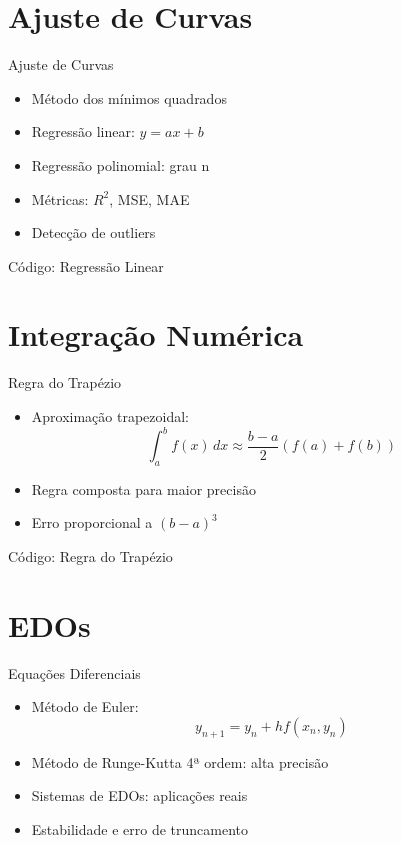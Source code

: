 \documentclass[11pt]{beamer}
\numberwithin{equation}{section}
\begin{document}
\section{Ajuste de Curvas}
\begin{frame}{Ajuste de Curvas}
\begin{itemize}
\item Método dos mínimos quadrados
\item Regressão linear: $y = ax + b$
\item Regressão polinomial: grau n
\item Métricas: $R^2$, MSE, MAE
\item Detecção de outliers
\end{itemize}
\end{frame}

\begin{frame}{Código: Regressão Linear}
\footnotesize
\end{frame}

\section{Integração Numérica}
\begin{frame}{Regra do Trapézio}
\begin{itemize}
\item Aproximação trapezoidal:
\begin{equation}
\int_a^b f(x) \, dx \approx \frac{b-a}{2} (f(a) + f(b))
\end{equation}
\item Regra composta para maior precisão
\item Erro proporcional a $(b-a)^3$
\end{itemize}
\end{frame}

\begin{frame}{Código: Regra do Trapézio}
\footnotesize
\end{frame}

\section{EDOs}
\begin{frame}{Equações Diferenciais}
\begin{itemize}
\item Método de Euler:
\begin{equation}
y_{n+1} = y_n + h f(x_n, y_n)
\end{equation}
\item Método de Runge-Kutta 4ª ordem: alta precisão
\item Sistemas de EDOs: aplicações reais
\item Estabilidade e erro de truncamento
\end{itemize}
\end{frame}
\end{document}
